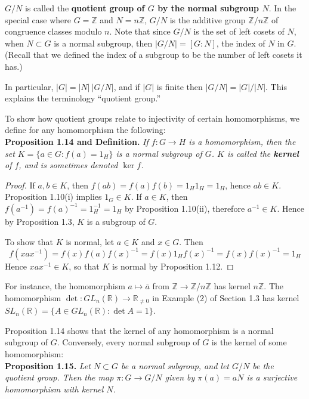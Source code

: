 \documentclass[leqno]{book}
\begin{document}
$G/N$ is called the \textbf{quotient group of $G$ by the normal subgroup $N$}.  In the special case where $G=\mathbb Z$ and $N=n\mathbb Z$, $G/N$ is the additive group $\mathbb Z/n\mathbb Z$ of congruence classes modulo $n$.  Note that since $G/N$ is the set of left cosets of $N$, when $N\subset G$ is a normal subgroup, then $|G/N|=[G:N]$, the index of $N$ in $G$.  (Recall that we defined the index of a subgroup to be the number of left cosets it has.)

In particular, $|G|=|N|~|G/N|$, and if $|G|$ is finite then $|G/N|=|G|/|N|$.  This explains the terminology ``quotient group.''

To show how quotient groups relate to injectivity of certain homomorphisms, we define for any homomorphism the following:\\

\noindent\textbf{Proposition 1.14 and Definition.} \emph{If $f:G\to H$ is a homomorphism, then the set $K=\{a\in G:f(a)=1_H\}$ is a normal subgroup of $G$.  $K$ is called the \textbf{kernel} of $f$, and is sometimes denoted $\ker f$.}
\begin{proof}
If $a,b\in K$, then $f(ab)=f(a)f(b)=1_H1_H=1_H$, hence $ab\in K$.  Proposition 1.10(i) implies $1_G\in K$.  If $a\in K$, then $f(a^{-1})=f(a)^{-1}=1_H^{-1}=1_H$ by Proposition 1.10(ii), therefore $a^{-1}\in K$.  Hence by Proposition 1.3, $K$ is a subgroup of $G$.

To show that $K$ is normal, let $a\in K$ and $x\in G$.  Then
$$f(xax^{-1})=f(x)f(a)f(x)^{-1}=f(x)1_Hf(x)^{-1}=f(x)f(x)^{-1}=1_H$$
Hence $xax^{-1}\in K$, so that $K$ is normal by Proposition 1.12.
\end{proof}

\noindent For instance, the homomorphism $a\mapsto\overline a$ from $\mathbb Z\to\mathbb Z/n\mathbb Z$ has kernel $n\mathbb Z$.  The homomorphism $\det:GL_n(\mathbb R)\to\mathbb R_{\ne 0}$ in Example (2) of Section 1.3 has kernel $SL_n(\mathbb R)=\{A\in GL_n(\mathbb R):\det A=1\}$.

Proposition 1.14 shows that the kernel of any homomorphism is a normal subgroup of $G$.  Conversely, every normal subgroup of $G$ is the kernel of some homomorphism:\\

\noindent\textbf{Proposition 1.15.} \emph{Let $N\subset G$ be a normal subgroup, and let $G/N$ be the quotient group.  Then the map $\pi:G\to G/N$ given by $\pi(a)=aN$ is a surjective homomorphism with kernel $N$.}\\
\end{document}
